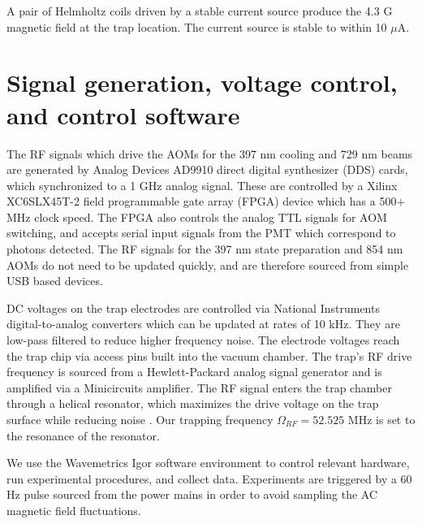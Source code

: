 A pair of Helmholtz coils driven by a stable current source produce the 4.3 G magnetic field at the trap location. The current source is stable to within 10 $\mu$A.   


\section{Signal generation, voltage control, and control software}

The RF signals which drive the AOMs for the 397 nm cooling and 729 nm beams are generated by Analog Devices AD9910 direct digital synthesizer (DDS) cards, which synchronized to a 1 GHz analog signal. These are controlled by a Xilinx XC6SLX45T-2 field programmable gate array (FPGA) device which has a 500$+$ MHz clock speed. The FPGA also controls the analog TTL signals for AOM switching, and accepts serial input signals from the PMT which correspond to photons detected. The RF signals for the 397 nm state preparation and 854 nm AOMs do not need to be updated quickly, and are therefore sourced from simple USB based devices.

DC voltages on the trap electrodes are controlled via National Instruments digital-to-analog converters which can be updated at rates of 10 kHz. They are low-pass filtered to reduce higher frequency noise. The electrode voltages reach the trap chip via access pins built into the vacuum chamber. The trap's RF drive frequency is sourced from a Hewlett-Packard analog signal generator and is amplified via a Minicircuits amplifier. The RF signal enters the trap chamber through a helical resonator, which maximizes the drive voltage on the trap surface while reducing noise \cite{Siverns2012}. Our trapping frequency $\Omega_{RF} = 52.525$ MHz is set to the resonance of the resonator. 

We use the Wavemetrics Igor software environment to control relevant hardware, run experimental procedures, and collect data. Experiments are triggered by a 60 Hz pulse sourced from the power mains in order to avoid sampling the AC magnetic field fluctuations. 

